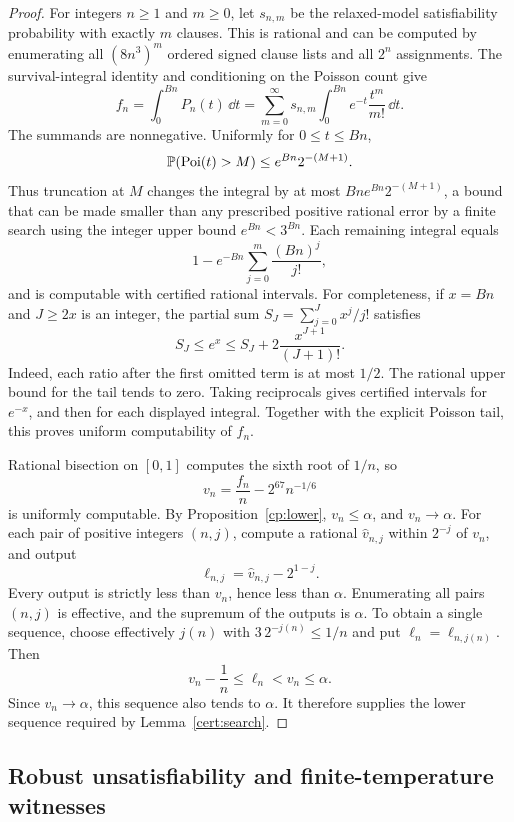\begin{proof}
For integers $n\ge1$ and $m\ge0$, let $s_{n,m}$ be the relaxed-model
satisfiability probability with exactly $m$ clauses. This is rational and
can be computed by enumerating all $(8n^3)^m$ ordered signed clause lists
and all $2^n$ assignments.
The survival-integral identity and conditioning on the Poisson count give
\[
 f_n=\int_0^{Bn}P_n(t)\,\dd t
 =\sum_{m=0}^\infty s_{n,m}
       \int_0^{Bn}e^{-t}\frac{t^m}{m!}\,\dd t.
\]
The summands are nonnegative. Uniformly for $0\le t\le Bn$,
\[
 \mathbb P(\operatorname{Poi}(t)>M)\le e^{Bn}2^{-(M+1)}.
\]
Thus truncation at $M$ changes the integral by at most
$Bn e^{Bn}2^{-(M+1)}$, a bound that can be made smaller than any prescribed
positive rational error by a finite search using the integer upper bound
$e^{Bn}<3^{Bn}$. Each remaining integral equals
\[
 1-e^{-Bn}\sum_{j=0}^m\frac{(Bn)^j}{j!},
\]
and is computable with certified rational intervals. For completeness,
if $x=Bn$ and $J\ge2x$ is an integer, the partial sum
$S_J=\sum_{j=0}^Jx^j/j!$ satisfies
\[
 S_J\le e^x\le S_J+2\frac{x^{J+1}}{(J+1)!}.
\]
Indeed, each ratio after the first omitted term is at most $1/2$.
The rational upper bound for the tail tends to zero. Taking reciprocals
gives certified intervals for $e^{-x}$, and then for each displayed
integral. Together with the explicit Poisson tail, this proves uniform
computability of $f_n$.

Rational bisection on $[0,1]$ computes the sixth root of $1/n$, so
\[
 v_n=\frac{f_n}{n}-2^{67}n^{-1/6}
\]
is uniformly computable. By Proposition~\ref{cp:lower}, $v_n\le\alpha$,
and $v_n\to\alpha$. For each pair of positive integers $(n,j)$, compute
a rational $\widehat v_{n,j}$ within $2^{-j}$ of $v_n$, and output
\[
 \ell_{n,j}=\widehat v_{n,j}-2^{1-j}.
\]
Every output is strictly less than $v_n$, hence less than $\alpha$.
Enumerating all pairs $(n,j)$ is effective, and the supremum of the
outputs is $\alpha$. To obtain a single sequence, choose effectively
$j(n)$ with $3\,2^{-j(n)}\le1/n$ and put $\ell_n=\ell_{n,j(n)}$.
Then
\[
 v_n-\frac1n\le\ell_n<v_n\le\alpha.
\]
Since $v_n\to\alpha$, this sequence also tends to $\alpha$.
It therefore supplies the lower sequence required by
Lemma~\ref{cert:search}.
\end{proof}

\subsection{Robust unsatisfiability and finite-temperature witnesses}

